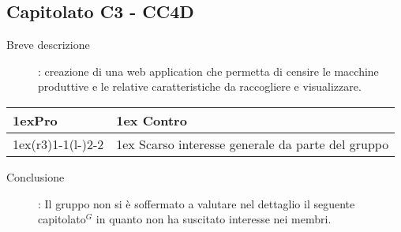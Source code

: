 \subsection{Capitolato C3 - CC4D}
\begin{description}
\item [Breve descrizione]: creazione di una web application che permetta di censire le macchine produttive e le relative caratteristiche da raccogliere e visualizzare.
\end{description}
\begin{table}[h]
\begin{tabularx}{\linewidth}{>{\parskip1ex}X@{\kern4\tabcolsep}>{\parskip1ex}X}
\hfil\bfseries Pro
&
\hfil\bfseries Contro
\\\cmidrule(r{3\tabcolsep}){1-1}\cmidrule(l{-\tabcolsep}){2-2}
 
&
Scarso interesse generale da parte del gruppo \\
\end{tabularx}
\end{table}
\begin{description}
	\item [Conclusione]: Il gruppo non si è soffermato a valutare nel dettaglio il seguente capitolato$^{G}$ in quanto non ha suscitato interesse nei membri.
\end{description}

\vspace{1cm}

